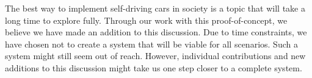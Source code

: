 
The best way to implement self-driving cars in society is a topic that will take a long time to explore fully. Through our work with this proof-of-concept, we believe we have made an addition to this discussion. Due to time constraints, we have chosen not to create a system that will be viable for all scenarios. Such a system might still seem out of reach. However, individual contributions and new additions to this discussion might take us one step closer to a complete system.

%
%
% 